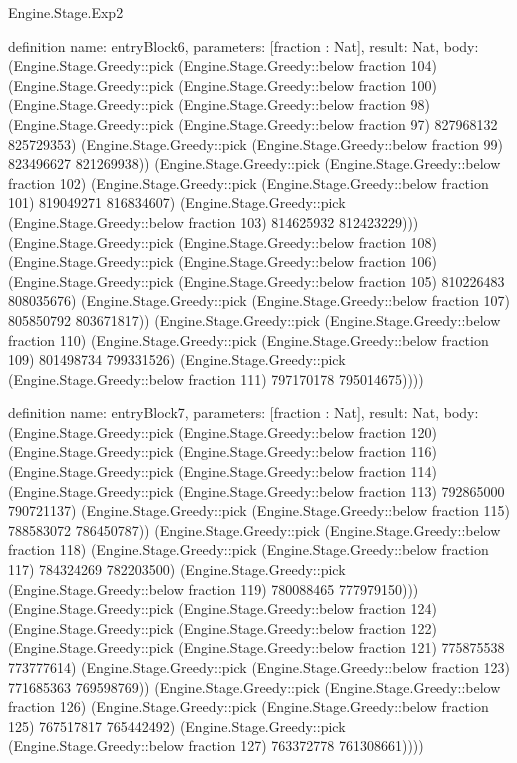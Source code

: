 \begin{lexlean}{Engine.Stage.Exp2}
\begin{semanticmodule}
definition{
  name: entryBlock6,
  parameters: [fraction : Nat],
  result: Nat,
  body: (Engine.Stage.Greedy::pick (Engine.Stage.Greedy::below fraction 104) (Engine.Stage.Greedy::pick (Engine.Stage.Greedy::below fraction 100) (Engine.Stage.Greedy::pick (Engine.Stage.Greedy::below fraction 98) (Engine.Stage.Greedy::pick (Engine.Stage.Greedy::below fraction 97) 827968132 825729353) (Engine.Stage.Greedy::pick (Engine.Stage.Greedy::below fraction 99) 823496627 821269938)) (Engine.Stage.Greedy::pick (Engine.Stage.Greedy::below fraction 102) (Engine.Stage.Greedy::pick (Engine.Stage.Greedy::below fraction 101) 819049271 816834607) (Engine.Stage.Greedy::pick (Engine.Stage.Greedy::below fraction 103) 814625932 812423229))) (Engine.Stage.Greedy::pick (Engine.Stage.Greedy::below fraction 108) (Engine.Stage.Greedy::pick (Engine.Stage.Greedy::below fraction 106) (Engine.Stage.Greedy::pick (Engine.Stage.Greedy::below fraction 105) 810226483 808035676) (Engine.Stage.Greedy::pick (Engine.Stage.Greedy::below fraction 107) 805850792 803671817)) (Engine.Stage.Greedy::pick (Engine.Stage.Greedy::below fraction 110) (Engine.Stage.Greedy::pick (Engine.Stage.Greedy::below fraction 109) 801498734 799331526) (Engine.Stage.Greedy::pick (Engine.Stage.Greedy::below fraction 111) 797170178 795014675))))
}

definition{
  name: entryBlock7,
  parameters: [fraction : Nat],
  result: Nat,
  body: (Engine.Stage.Greedy::pick (Engine.Stage.Greedy::below fraction 120) (Engine.Stage.Greedy::pick (Engine.Stage.Greedy::below fraction 116) (Engine.Stage.Greedy::pick (Engine.Stage.Greedy::below fraction 114) (Engine.Stage.Greedy::pick (Engine.Stage.Greedy::below fraction 113) 792865000 790721137) (Engine.Stage.Greedy::pick (Engine.Stage.Greedy::below fraction 115) 788583072 786450787)) (Engine.Stage.Greedy::pick (Engine.Stage.Greedy::below fraction 118) (Engine.Stage.Greedy::pick (Engine.Stage.Greedy::below fraction 117) 784324269 782203500) (Engine.Stage.Greedy::pick (Engine.Stage.Greedy::below fraction 119) 780088465 777979150))) (Engine.Stage.Greedy::pick (Engine.Stage.Greedy::below fraction 124) (Engine.Stage.Greedy::pick (Engine.Stage.Greedy::below fraction 122) (Engine.Stage.Greedy::pick (Engine.Stage.Greedy::below fraction 121) 775875538 773777614) (Engine.Stage.Greedy::pick (Engine.Stage.Greedy::below fraction 123) 771685363 769598769)) (Engine.Stage.Greedy::pick (Engine.Stage.Greedy::below fraction 126) (Engine.Stage.Greedy::pick (Engine.Stage.Greedy::below fraction 125) 767517817 765442492) (Engine.Stage.Greedy::pick (Engine.Stage.Greedy::below fraction 127) 763372778 761308661))))
}


\end{semanticmodule}
\end{lexlean}
